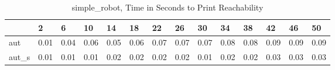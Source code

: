 \begin{table}
\caption{simple_robot, Time in Seconds to Print Reachability}
\label{simple_robot_states_time}
\begin{tabular}{llllllllllllll}
\toprule
 & 2 & 6 & 10 & 14 & 18 & 22 & 26 & 30 & 34 & 38 & 42 & 46 & 50 \\
\midrule
aut & 0.01 & 0.04 & 0.06 & 0.05 & 0.06 & 0.07 & 0.07 & 0.07 & 0.08 & 0.08 & 0.09 & 0.09 & 0.09 \\
aut_s & 0.01 & 0.01 & 0.01 & 0.02 & 0.02 & 0.02 & 0.02 & 0.01 & 0.02 & 0.02 & 0.03 & 0.03 & 0.03 \\
\bottomrule
\end{tabular}
\end{table}
